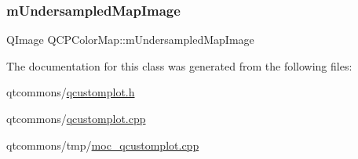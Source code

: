 \subsubsection{\texorpdfstring{mUndersampledMapImage}{mUndersampledMapImage}}
{\footnotesize\ttfamily Q\+Image Q\+C\+P\+Color\+Map\+::m\+Undersampled\+Map\+Image\hspace{0.3cm}{\ttfamily [protected]}}



The documentation for this class was generated from the following files\+:\begin{DoxyCompactItemize}
\item 
qtcommons/\mbox{\hyperlink{qcustomplot_8h}{qcustomplot.\+h}}\item 
qtcommons/\mbox{\hyperlink{qcustomplot_8cpp}{qcustomplot.\+cpp}}\item 
qtcommons/tmp/\mbox{\hyperlink{moc__qcustomplot_8cpp}{moc\+\_\+qcustomplot.\+cpp}}\end{DoxyCompactItemize}

